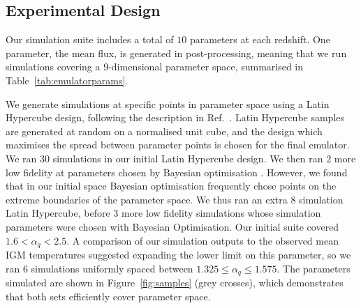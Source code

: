 \documentclass[a4paper,11pt]{article}
\begin{document}

\subsection{Experimental Design}
\label{sec:latinhypercube}


Our simulation suite includes a total of $10$ parameters at each redshift. One parameter, the mean flux, is generated in post-processing, meaning that we run simulations covering a $9$-dimensional parameter space, summarised in Table~\ref{tab:emulatorparams}.

We generate simulations at specific points in parameter space using a Latin Hypercube design, following the description in Ref.~\cite{Bird:2019}. Latin Hypercube samples are generated at random on a normalised unit cube, and the design which maximises the spread between parameter points is chosen for the final emulator. We ran $30$ simulations in our initial Latin Hypercube design. We then ran $2$ more low fidelity at parameters chosen by Bayesian optimisation \cite{Rogers:2019}.
However, we found that in our initial space Bayesian optimisation frequently chose points on the extreme boundaries of the parameter space.
We thus ran an extra $8$ simulation Latin Hypercube, before $3$ more low fidelity simulations whose simulation parameters were chosen with Bayesian Optimisation. Our initial suite covered $1.6 < \alpha_q < 2.5$. A comparison of our simulation outputs to the observed mean IGM temperatures suggested expanding the lower limit on this parameter, so we ran $6$ simulations uniformly spaced between $1.325 \leq \alpha_q \leq 1.575$. The parameters simulated are shown in Figure~\ref{fig:samples} (grey crosses), which demonstrates that both sets efficiently cover parameter space.
\end{document}
